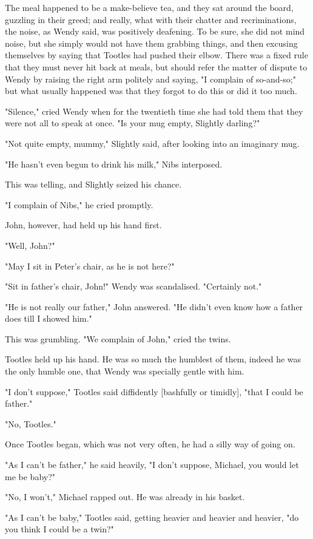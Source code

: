 The meal happened to be a make-believe tea, and they sat around the board,
guzzling in their greed; and really, what with their chatter and
recriminations, the noise, as Wendy said, was positively deafening. To be
sure, she did not mind noise, but she simply would not have them grabbing
things, and then excusing themselves by saying that Tootles had pushed
their elbow. There was a fixed rule that they must never hit back at
meals, but should refer the matter of dispute to Wendy by raising the
right arm politely and saying, "I complain of so-and-so;" but what usually
happened was that they forgot to do this or did it too much.


"Silence," cried Wendy when for the twentieth time she had told them that
they were not all to speak at once. "Is your mug empty, Slightly darling?"


"Not quite empty, mummy," Slightly said, after looking into an imaginary
mug.


"He hasn't even begun to drink his milk," Nibs interposed.


This was telling, and Slightly seized his chance.


"I complain of Nibs," he cried promptly.


John, however, had held up his hand first.


"Well, John?"


"May I sit in Peter's chair, as he is not here?"


"Sit in father's chair, John!" Wendy was scandalised. "Certainly not."


"He is not really our father," John answered. "He didn't even know how a
father does till I showed him."


This was grumbling. "We complain of John," cried the twins.


Tootles held up his hand. He was so much the humblest of them, indeed he
was the only humble one, that Wendy was specially gentle with him.


"I don't suppose," Tootles said diffidently [bashfully or timidly], "that
I could be father."


"No, Tootles."


Once Tootles began, which was not very often, he had a silly way of going
on.


"As I can't be father," he said heavily, "I don't suppose, Michael, you
would let me be baby?"


"No, I won't," Michael rapped out. He was already in his basket.


"As I can't be baby," Tootles said, getting heavier and heavier and
heavier, "do you think I could be a twin?"


